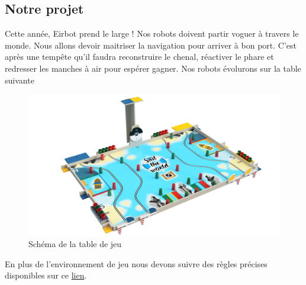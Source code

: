 \documentclass[a4paper,10pt]{article}
\begin{document}
\begin{spacing}{1.5}
\section{Notre projet}
Cette année, Eirbot prend le large ! Nos robots doivent partir voguer à travers
le monde. Nous allons devoir maitriser la navigation pour arriver à bon port.
C'est après une tempête qu'il faudra reconstruire le chenal, réactiver le phare
et redresser les manches à air pour espérer gagner. Nos robots évolurons sur la
table suivante
\begin{figure}[H]
  \center
  \includegraphics[scale=0.2]{table.png}
  \caption{Schéma de la table de jeu}
\end{figure}
En plus de l'environnement de jeu nous devons suivre des règles précises
disponibles sur ce \href{https://www.coupederobotique.fr/wp-content/uploads/Eurobot2020_Rules_Cup_OFFICIAL_FR.pdf}{lien}.

\end{spacing}
\end{document}
